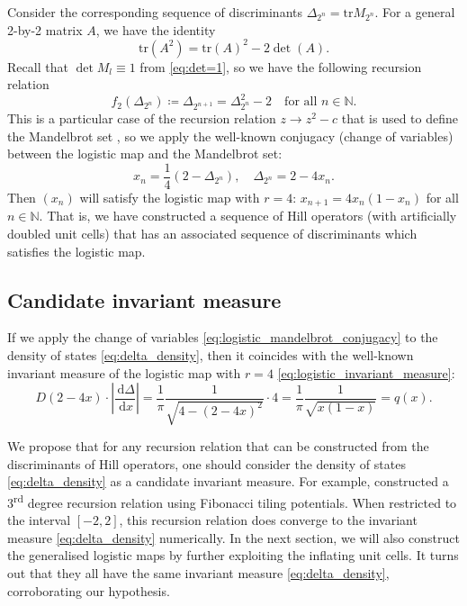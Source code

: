 \documentclass[a4paper]{article}
\theoremstyle{definition}
\numberwithin{equation}{section}
\numberwithin{theorem}{section}
\newcommand{\de}{\,\mathrm{d}}
\newcommand{\tr}{\mathrm{tr}}
\begin{document}
{Consider the corresponding sequence of discriminants $\Delta_{2^n}=\tr M_{2^n}$. For a general 2-by-2 matrix $A$, we have the identity
\begin{equation*}
    \tr(A^2) = \tr(A)^2 - 2\det(A).
\end{equation*}
Recall that $\det M_l\equiv1$ from \eqref{eq:det=1}, so we have the following recursion relation
\begin{equation*}
    f_2(\Delta_{2^n})\coloneqq\Delta_{2^{n+1}}=\Delta_{2^n}^2-2\quad\text{for all $n\in\mathbb{N}$.}
\end{equation*}
This is a particular case of the recursion relation $z\rightarrow z^2-c$ that is used to define the Mandelbrot set \cite{mandelbrot2004fractals}, so we apply the well-known conjugacy (change of variables) between the logistic map and the Mandelbrot set:
\begin{equation} \label{eq:logistic_mandelbrot_conjugacy}
    x_n=\frac{1}{4}(2-\Delta_{2^n}),\quad\Delta_{2^n}=2-4x_n.
\end{equation}
Then $(x_n)$ will satisfy the logistic map with $r=4$: $x_{n+1}=4x_n(1-x_n)$ for all $n\in\mathbb{N}$. That is, we have constructed a sequence of Hill operators (with artificially doubled unit cells) that has an associated sequence of discriminants which satisfies the logistic map.

\subsection{Candidate invariant measure} \label{sec:candidate_invariance}

If we apply the change of variables \eqref{eq:logistic_mandelbrot_conjugacy} to the density of states \eqref{eq:delta_density}, then it coincides with the well-known invariant measure of the logistic map with $r=4$ \eqref{eq:logistic_invariant_measure}:
\begin{equation*}
    D(2-4x)\cdot\left|\frac{\de\Delta}{\de x}\right|=\frac{1}{\pi}\frac{1}{\sqrt{4-(2-4x)^2}}\cdot 4=\frac{1}{\pi}\frac{1}{\sqrt{x(1-x)}}=q(x).
\end{equation*}

We propose that for any recursion relation that can be constructed from the discriminants of Hill operators, one should consider the density of states \eqref{eq:delta_density} as a candidate invariant measure. For example, \cite{davies2024vanhove} constructed a 3\textsuperscript{rd} degree recursion relation using Fibonacci tiling potentials. When restricted to the interval $[-2,2]$, this recursion relation does converge to the invariant measure \eqref{eq:delta_density} numerically. In the next section, we will also construct the generalised logistic maps by further exploiting the inflating unit cells. It turns out that they all have the same invariant measure \eqref{eq:delta_density}, corroborating our hypothesis.

}
\end{document}
